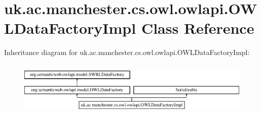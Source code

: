 \hypertarget{classuk_1_1ac_1_1manchester_1_1cs_1_1owl_1_1owlapi_1_1_o_w_l_data_factory_impl}{\section{uk.\-ac.\-manchester.\-cs.\-owl.\-owlapi.\-O\-W\-L\-Data\-Factory\-Impl Class Reference}
\label{classuk_1_1ac_1_1manchester_1_1cs_1_1owl_1_1owlapi_1_1_o_w_l_data_factory_impl}
}
Inheritance diagram for uk.\-ac.\-manchester.\-cs.\-owl.\-owlapi.\-O\-W\-L\-Data\-Factory\-Impl\-:\begin{figure}[H]
\begin{center}
\leavevmode
\includegraphics[height=2.592592cm]{classuk_1_1ac_1_1manchester_1_1cs_1_1owl_1_1owlapi_1_1_o_w_l_data_factory_impl}
\end{center}
\end{figure}
